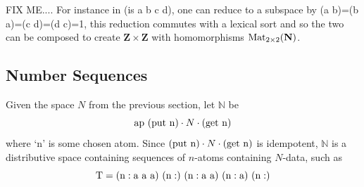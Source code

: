\documentclass[11pt]{article}
\begin{document}
FIX ME.... For instance in (is a b c d), one can reduce to a subspace by (a b)=(b a)=(c d)=(d c)=1, this reduction commutes with a lexical sort 
and so the two can be composed to create $\mathbf Z\times\mathbf Z$ with homomorphisms ${\rm Mat}_{2\times2}(\mathbf N)$. 

\subsection{Number Sequences}

      Given the space $N$ from the previous section, let $\mathbb{N}$ be 
\begin{equation}
{{\rm ap}\ ({\rm put\ {\rm n}})\cdot N \cdot ({\rm get\ {\rm n}})}
\end{equation}
where `n' is some chosen atom.  Since $({\rm put\ n})\cdot N \cdot ({\rm get\ n})$ is idempotent, ${\mathbb N}$ is a distributive space containing 
sequences of $n$-atoms containing $N$-data, such as 
\begin{equation} 
{\rm T = (n:a\ a\ a)\ (n:)\ (n:a\ a)\ (n:a)\ (n:)}
\end{equation} 
\end{document}
